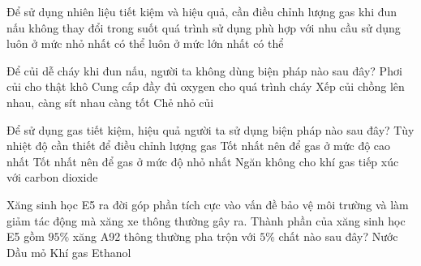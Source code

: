 \documentclass[Main.tex]{subfiles}
\begin{document}
\begin{ex}%
	Để sử dụng nhiên liệu tiết kiệm và hiệu quả, cần điều chỉnh lượng gas khi đun nấu
	\choice
	{không thay đổi trong suốt quá trình sử dụng}
	{\True phù hợp với nhu cầu sử dụng}
	{luôn ở mức nhỏ nhất có thể}
	{luôn ở mức lớn nhất có thể}
\end{ex}

\begin{ex}%
	Để củi dễ cháy khi đun nấu, người ta không dùng biện pháp nào sau đây?
	\choice
	{Phơi củi cho thật khô}
	{Cung cấp đầy đủ oxygen cho quá trình cháy}
	{\True Xếp củi chồng lên nhau, càng sít nhau càng tốt}
	{Chẻ nhỏ củi}
\end{ex}

\begin{ex}%
	Để sử dụng gas tiết kiệm, hiệu quả người ta sử dụng biện pháp nào sau đây?
	\choice
	{\True Tùy nhiệt độ cần thiết để điều chỉnh lượng gas}
	{Tốt nhất nên để gas ở mức độ cao nhất}
	{Tốt nhất nên để gas ở mức độ nhỏ nhất}
	{Ngăn không cho khí gas tiếp xúc với carbon dioxide}
\end{ex}

\begin{ex}%
	Xăng sinh học E5 ra đời góp phần tích cực vào vấn đề bảo vệ môi trường và làm giảm tác động mà xăng xe thông thường gây ra. Thành phần của xăng sinh học E5 gồm $95\%$ xăng A92 thông thường pha trộn với $5\%$ chất nào sau đây?
	\choice
	{Nước}
	{Dầu mỏ}
	{Khí gas}
	{\True Ethanol}
\end{ex}
\end{document}
